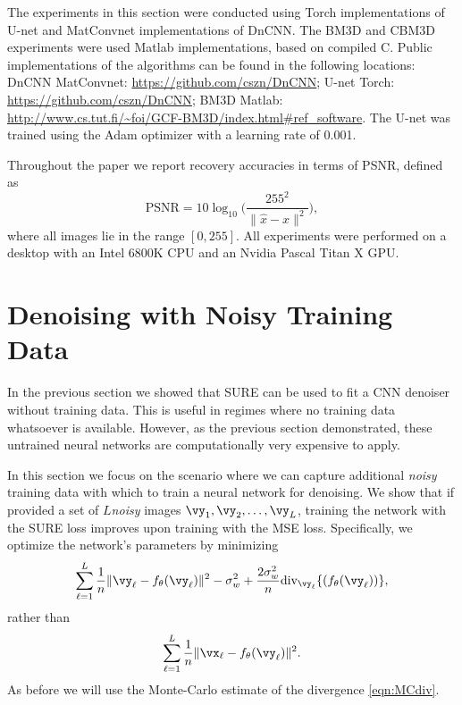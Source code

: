 \documentclass{article}
\begin{document}
The experiments in this section were conducted using Torch implementations of U-net and MatConvnet implementations of DnCNN. 
The BM3D and CBM3D experiments were used Matlab implementations, based on compiled C. Public implementations of the algorithms can be found in the following locations:
DnCNN MatConvnet: \url{https://github.com/cszn/DnCNN};
U-net Torch: \url{https://github.com/cszn/DnCNN};
BM3D Matlab: \url{http://www.cs.tut.fi/~foi/GCF-BM3D/index.html#ref_software}.
The U-net was trained using the Adam optimizer \cite{ADAMopt} with a learning rate of 0.001.

Throughout the paper we report recovery accuracies in terms of PSNR, defined as 
\[
\text{PSNR}=10\log_{10}\bigg(\frac{255^2}{\|\hat{x}-x\|^2}\bigg),
\]
where all images lie in the range $[0,255]$. 
All experiments were performed on a desktop with an Intel 6800K CPU and an Nvidia Pascal Titan X GPU.

\section{Denoising with Noisy Training Data}\label{sec:Denoising}

In the previous section we showed that SURE can be used to fit a CNN denoiser without training data. This is useful in regimes where no training data whatsoever is available. However, as the previous section demonstrated, these untrained neural networks are computationally very expensive to apply.

In this section we focus on the scenario where we can capture additional {\em noisy} training data with which to train a neural network for denoising. 
We show that if provided a set of $L$\emph{noisy} images $\vy_1, \vy_2, \ldots, \vy_L$, 
training the network with the SURE loss improves upon training with the MSE loss. Specifically, we optimize the network's parameters by minimizing
\[
\sum_{\ell=1}^L  \frac{1}{n}\|\vy_\ell-f_\theta (\vy_\ell)\|^2-\sigma_w^2+\frac{2\sigma_w^2}{n}\text{div}_{\vy_\ell}\{(f_\theta (\vy_\ell))\},
\]
rather than 
\[
\sum_{\ell=1}^L \frac{1}{n}\|\vx_\ell-f_\theta(\vy_\ell)\|^2.
\]
As before we will use the Monte-Carlo estimate of the divergence \eqref{eqn:MCdiv}.
\end{document}
